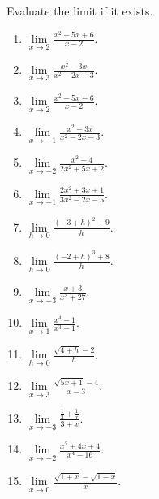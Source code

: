 Evaluate the limit if it exists.
\begin{multicols}{2}
\begin{enumerate}[ref={\fcProblemRef}]
\item $\displaystyle\lim\limits_{x\to 2}\frac{x^2-5x+6}{x-2} $. 

\item $\displaystyle\lim\limits_{x\to 3}\frac{x^2-3x}{x^2-2x-3} $.

\item $\displaystyle\lim\limits_{x\to 2}\frac{x^2-5x-6}{x-2} $.

\item $\displaystyle\lim\limits_{x\to -1}\frac{x^2-3x}{x^{2}-2x-3} $.

\item $\displaystyle\lim\limits_{x\to -2}\frac{x^2-4}{2x^2+5x+2} $.

\item $\displaystyle\lim\limits_{x\to -1}\frac{2x^2+3x+1}{3x^2-2x-5} $.

\item $\displaystyle\lim\limits_{h\to 0}\frac{(-3+h)^2-9}{h} $.

\item $\displaystyle\lim\limits_{h\to 0}\frac{(-2+h)^3+8}{h} $.

\item $\displaystyle\lim\limits_{x\to -3}\frac{x+3}{x^3+27} $.

\item $\displaystyle\lim\limits_{x\to 1}\frac{x^4-1}{x^3-1} $.

\item $\displaystyle\lim\limits_{h\to 0}\frac{\sqrt{4+h}-2}{h} $.

\item $\displaystyle\lim\limits_{x\to 3} \frac{\sqrt{5x+1}-4}{x-3}$.

\item $\displaystyle\lim\limits_{x\to -3} \frac{\frac{1}{3}+ \frac{1}{x}} {3+x}$.

\item $\displaystyle\lim\limits_{x\to -2} \frac{x^2+4x+4}{x^4-16}$.

\item $\displaystyle\lim\limits_{x\to 0} \frac{\sqrt{1+x}- \sqrt{1-x}}{x}$.


\end{enumerate}
\end{multicols}
